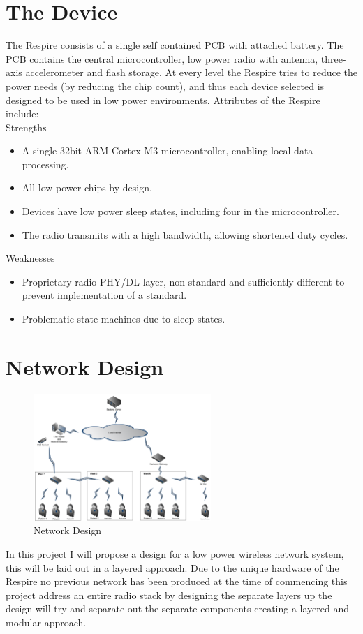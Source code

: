 \section{The Device}
The Respire consists of a single self contained \ac{PCB} with attached battery. The PCB contains the
central microcontroller, low power radio with antenna, three-axis accelerometer and flash storage.
At every level the Respire tries to reduce the power needs (\eg by reducing the chip count), and thus
each device selected is designed to be used in low power environments. Attributes of the Respire
include:-\\
\large{Strengths}
\begin{itemize}
  \item A single 32bit ARM Cortex-M3 microcontroller, enabling local data processing.
  \item All low power chips by design.
  \item Devices have low power sleep states, including four in the microcontroller.
  \item The radio transmits with a high bandwidth, allowing shortened duty cycles.
\end{itemize}
\large{Weaknesses}
\begin{itemize}
  \item Proprietary radio \ac{PHY}/\ac{DL} layer, non-standard and sufficiently different to prevent implementation of a standard.
  \item Problematic state machines due to sleep states.
\end{itemize}

\section{Network Design}
\begin{figure}
  \vspace{-10pt}
  \begin{center}
    \includegraphics[width=0.6\textwidth, keepaspectratio=true]{images/respire_network.png}
  \end{center}
  \caption{Network Design}
  \vspace{-10pt}
\end{figure}
In this project I will propose a design for a low power wireless network system, this will be laid out in
a layered approach. Due to the unique hardware of the Respire no previous network has been
produced at the time of commencing this project address an entire radio stack by designing the
separate layers up the design will try and separate out the separate components creating a layered
and modular approach.

